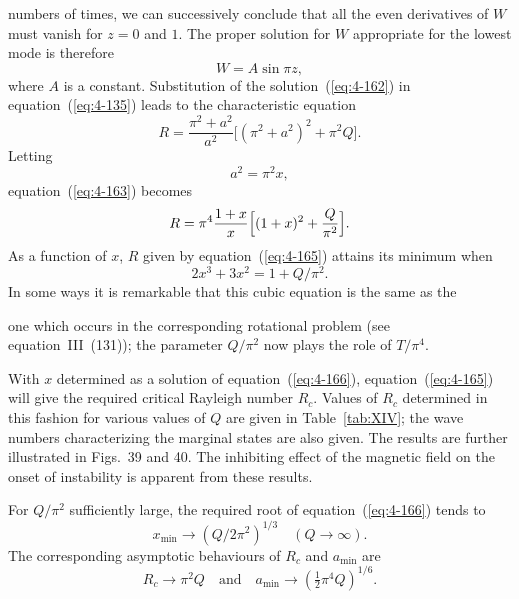 %
numbers of times, we can successively conclude that all the even derivatives of $W$ must vanish for $z=0$ and $1$. The proper solution for $W$ appropriate for the lowest mode is therefore
\begin{equation}
\label{eq:4-162}
W = A\sin\pi z,
\end{equation}
where $A$ is a constant. Substitution of the solution~(\ref{eq:4-162}) in equation~(\ref{eq:4-135}) leads to the characteristic equation
\begin{equation}
\label{eq:4-163}
R = \frac{\pi^2+a^2}{a^2}\bigl[(\pi^2+a^2)^2+\pi^2 Q\bigr].
\end{equation}
Letting
\begin{equation}
\label{eq:4-164}
a^2 = \pi^2 x,
\end{equation}
equation~(\ref{eq:4-163}) becomes
\begin{equation}
\label{eq:4-165}
R = \pi^4\frac{1+x}{x}\Bigl[(1+x)^2+\frac{Q}{\pi^2}\Bigr].
\end{equation}
As a function of $x$, $R$ given by equation~(\ref{eq:4-165}) attains its minimum when
\begin{equation}
\label{eq:4-166}
2x^3+3x^2 = 1+Q/\pi^2.
\end{equation}
In some ways it is remarkable that this cubic equation is the same as the


one which occurs in the corresponding rotational problem (see equation~III~(131)); the parameter $Q/\pi^2$ now plays the role of $T/\pi^4$.

With $x$ determined as a solution of equation~(\ref{eq:4-166}), equation~(\ref{eq:4-165}) will give the required critical Rayleigh number $R_c$. Values of $R_c$ determined in this fashion for various values of $Q$ are given in Table~\ref{tab:XIV}; the wave numbers characterizing the marginal states are also given. The results are further illustrated in Figs.~39 and 40. The inhibiting effect of the magnetic field on the onset of instability is apparent from these results.

For $Q/\pi^2$ sufficiently large, the required root of equation~(\ref{eq:4-166}) tends to
\begin{equation}
\label{eq:4-167}
x_{\min} \to (Q/2\pi^2)^{1/3} \quad (Q\to\infty).
\end{equation}
The corresponding asymptotic behaviours of $R_c$ and $a_{\min}$ are
\begin{equation}
\label{eq:4-168}
R_c \to \pi^2 Q \quad\text{and}\quad a_{\min} \to (\tfrac{1}{2}\pi^4 Q)^{1/6}.
\end{equation}

